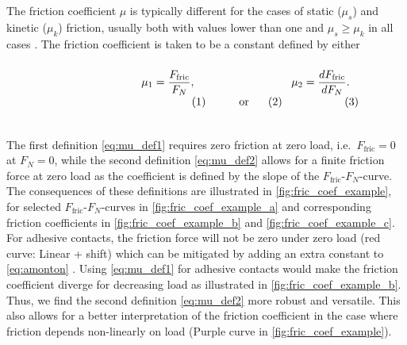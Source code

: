 The friction coefficient $\mu$ is typically different for the cases of static
($\mu_s$) and kinetic ($\mu_k$) friction, usually both with values lower than
one and $\mu_s \ge \mu_k$ in all cases \cite[p. 6]{gnecco_meyer_2015}. The friction coefficient is taken to be a constant defined by either
\cite{gao_frictional_2004} \\
\vspace{0.1cm}
\begin{subequations}
\noindent\begin{minipage}{.2\linewidth}
  \hfill
\end{minipage}
\begin{minipage}[b]{0.2\linewidth}
  \begin{align}
    \mu_1 = \frac{F_{\text{fric}}}{F_N},
    \label{eq:mu_def1}
  \end{align}
\end{minipage}
\begin{minipage}[b]{0.2\linewidth}
  \begin{align*}
    \text{or}
  \end{align*}
\end{minipage}
\begin{minipage}[b]{0.2\linewidth}
  \begin{align}
    \mu_2 = \frac{dF_{\text{fric}}}{dF_N}.
    \label{eq:mu_def2}
  \end{align}
\end{minipage}
\begin{minipage}{.2\linewidth}
\end{minipage}
\label{eq:mu_def}
\end{subequations}
\vspace{0.1cm}
\\
\noindent The first definition \cref{eq:mu_def1} requires zero friction at zero
load, i.e.\ $F_{\text{fric}} = 0$ at $F_N = 0$, while the second definition
\cref{eq:mu_def2} allows for a finite friction force at zero load as the
coefficient is defined by the slope of the $F_{\text{fric}}$-$F_N$-curve. The
consequences of these definitions are illustrated in
\cref{fig:fric_coef_example}, for selected $F_{\text{fric}}$-$F_N$-curves in
\cref{fig:fric_coef_example_a} and corresponding friction coefficients in
\cref{fig:fric_coef_example_b} and \cref{fig:fric_coef_example_c}. For adhesive
contacts, the friction force will not be zero under zero load (red curve: Linear
+ shift) which can be mitigated by adding an extra constant to
\cref{eq:amonton} \cite{gao_frictional_2004}. Using \cref{eq:mu_def1} for
adhesive contacts would make the friction coefficient diverge for decreasing
load as illustrated in \cref{fig:fric_coef_example_b}. Thus, we find the second
definition \cref{eq:mu_def2} more robust and versatile. This also allows for a better interpretation of the friction coefficient in the case where
friction depends non-linearly on load (Purple curve in
\cref{fig:fric_coef_example}). 


